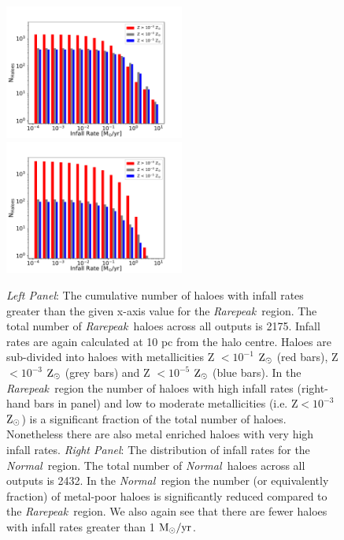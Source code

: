 \documentclass[graphics, twocolumn, usenatbib]{mn2e}
\newcommand{\msolaryrc} {$\rm{M_{\odot}/yr}$}
\newcommand{\zsolar} {$\rm{Z_{\odot}}~$}
\newcommand{\zsolarc} {$\rm{Z_{\odot}}$}
\newcommand{\rarepeak} {\textit{Rarepeak~}}
\newcommand{\normal} {\textit{Normal~}}
\begin{document}
\begin{figure}
\centering
\begin{minipage}{175mm}      \begin{center} 
\centerline{
\includegraphics[width=0.525\textwidth]{FIGURES/Rarepeak_NHaloes.pdf}
\includegraphics[width=0.525\textwidth]{FIGURES/Normal_NHaloes.pdf}}
\caption{\textit{Left Panel}: The cumulative number of haloes with infall rates greater than the given
  x-axis value for the \rarepeak region.  The total number of \rarepeak haloes across all outputs
  is 2175. Infall rates are again calculated at 10 pc from the halo centre.
  Haloes are sub-divided into haloes with metallicities Z $< 10^{-1}$ \zsolar (red bars),
  Z $< 10^{-3}$ \zsolar (grey bars) and  Z $< 10^{-5}$ \zsolar (blue bars). In the \rarepeak region
  the number of haloes with high infall rates (right-hand bars in panel) and low to moderate metallicities
  (i.e. Z$ < 10^{-3}$ \zsolarc) is a significant fraction of the total number of haloes. Nonetheless there
  are also metal enriched haloes with very high infall rates. \textit{Right Panel}: The distribution of
  infall rates for the \normal region. The  total number of \normal haloes across all outputs is 2432.
  In the \normal region the number (or equivalently fraction) of metal-poor haloes is significantly reduced
  compared to the \rarepeak region. We also again see that there are fewer haloes with infall rates greater
  than 1 \msolaryrc. } \label{Fig:Histogram}
\end{center} \end{minipage}

\end{figure}
\end{document}
